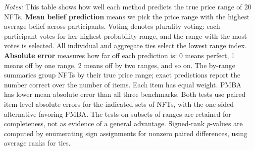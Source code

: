 \documentclass[12pt,reqno]{amsart}
\begin{document}
\begin{table}[htbp]
\medskip
\begin{minipage}{.98\textwidth}
\footnotesize
\textit{Notes:} This table shows how well each method predicts
the true price range of 20 NFTs.
\textbf{Mean belief prediction} means we pick the price range
with the highest average belief across participants.
Voting denotes plurality voting: each participant votes for
her highest-probability range, and the range with the most
votes is selected.
All individual and aggregate ties select the lowest range index.
\textbf{Absolute error} measures how far off each prediction is:
0 means perfect, 1 means off by one range, 2 means off by two
ranges, and so on.
The by-range summaries group NFTs by their true price range;
exact predictions report the number correct over the number
of items. Each item has equal weight.
PMBA has lower mean absolute error than all three benchmarks.
 Both tests use paired item-level absolute errors for the indicated sets of NFTs, with the one-sided alternative favoring PMBA. The tests on subsets of ranges are retained for completeness, not as evidence of a general advantage.
Signed-rank $p$-values are computed by enumerating sign
assignments for nonzero paired differences, using average
ranks for ties.
\end{minipage}
\end{table}
\end{document}
